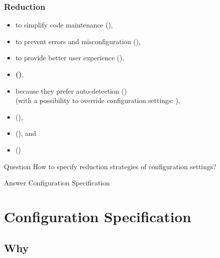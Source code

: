 \documentclass{beamer}
\begin{document}
\begin{frame}
	\frametitle{Reduction}
	\methodQuestion{}
	\begin{itemize}
	\item to simplify code maintenance (),
	\item to prevent errors and misconfiguration (),
	\item to provide better user experience (),
	\item \textbf{ ()},
	\item because they prefer auto-detection () \\ (with a possibility to override configuration settings: ),
	\item {} (),
	\item {} (), and
	\item {} ()
	\end{itemize}
\end{frame}

\begin{frame}
	\begin{alertblock}{Question}
	How to specify reduction strategies of configuration settings?
	\end{alertblock}
	\pause
	\begin{exampleblock}{Answer}
	Configuration Specification
	\end{exampleblock}
\end{frame}

\section{Configuration Specification}

\subsection{Why}

\begin{frame}
	\methodQuestion{}
\end{frame}
\end{document}
